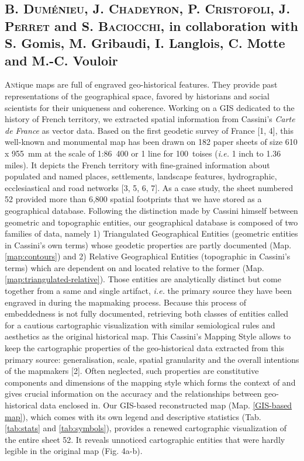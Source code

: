 \documentclass[portrait,a0]{sciposter}
\begin{document}
\vspace{1cm}
\begin{minipage}[b]{\textwidth}
  \setlength{\parindent}{-0em}
  \begin{multicols}{3}
    \section*{\normalfont B. \textsc{Duménieu}, J. \textsc{Chadeyron}, P. \textsc{Cristofoli}, J. \textsc{Perret} and S. \textsc{Baciocchi}, in collaboration with S. Gomis, M. Gribaudi, I. Langlois, C. Motte and M.-C. Vouloir}
    \lettrine{A}ntique maps are full of engraved geo-historical features. They provide past representations of the geographical space, favored by historians and social scientists for their uniqueness and coherence. Working on a GIS dedicated to the history of French territory, we extracted spatial information from Cassini’s \textit{Carte de France} as vector data. Based on the first geodetic survey of France [1, 4], this well-known and monumental map has been drawn on 182 paper sheets of size 610 x 955~mm at the scale of 1:86~400 or 1 line for 100~toises (\textit{i.e.} 1 inch to 1.36 miles). It depicts the French territory with fine-grained information about populated and named places, settlements, landscape features, hydrographic, ecclesiastical and road networks [3, 5, 6, 7]. As a case study, the sheet numbered 52 provided more than 6,800 spatial footprints that we have stored as a geographical database. Following the distinction made by Cassini himself between \og geometric \fg and \og topographic \fg entities, our geographical database is composed of two families of data, namely 1) Triangulated Geographical Entities (\og geometric \fg entities in Cassini’s own terms) whose geodetic properties are partly documented (Map. \ref{map:contours}) and 2) Relative Geographical Entities (\og topographic \fg in Cassini’s terms) which are dependent on and located relative to the former (Map. \ref{map:triangulated-relative}). Those entities are analytically distinct but come together from a same and single artifact, \emph{i.e.} the primary source they have been engraved in during the mapmaking process. Because this process of embeddedness is not fully documented, retrieving both classes of entities called for a cautious cartographic visualization with similar semiological rules and aesthetics as the original historical map. This \og Cassini's Mapping Style \fg allows to keep the cartographic properties of the geo-historical data extracted from this primary source: generalisation, scale, spatial granularity and the overall intentions of the mapmakers [2]. Often neglected, such properties are constitutive components and dimensions of the mapping style which forms the context of and gives crucial information on the accuracy and the relationships between geo-historical data enclosed in. Our GIS-based reconstructed map (Map. \ref{GIS-based map}),  which comes with its own legend and descriptive statistics (Tab. \ref{tab:stats} and \ref{tab:symbols}), provides a renewed cartographic visualization of the entire sheet 52. It reveals unnoticed cartographic entities that were hardly legible in the original map (Fig. 4a-b).\\

\end{multicols}
\end{minipage}
\end{document}
